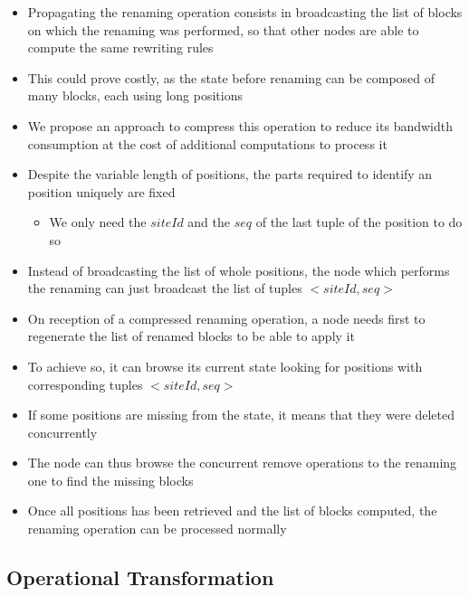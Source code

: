 \documentclass{article}
\theoremstyle{definition}
\begin{document}
\begin{itemize}
    \item Propagating the renaming operation consists in broadcasting the list of blocks on which the renaming was performed, so that other nodes are able to compute the same rewriting rules
    \item This could prove costly, as the state before renaming can be composed of many blocks, each using long positions
    \item We propose an approach to compress this operation to reduce its bandwidth consumption at the cost of additional computations to process it
    \item Despite the variable length of positions, the parts required to identify an position uniquely are fixed
    \begin{itemize}
        \item We only need the $siteId$ and the $seq$ of the last tuple of the position to do so
    \end{itemize}
    \item Instead of broadcasting the list of whole positions, the node which performs the renaming can just broadcast the list of tuples $<siteId, seq>$
    \item On reception of a compressed renaming operation, a node needs first to regenerate the list of renamed blocks to be able to apply it
    \item To achieve so, it can browse its current state looking for positions with corresponding tuples $<siteId, seq>$
    \item If some positions are missing from the state, it means that they were deleted concurrently
    \item The node can thus browse the concurrent remove operations to the renaming one to find the missing blocks
    \item Once all positions has been retrieved and the list of blocks computed, the renaming operation can be processed normally
\end{itemize}

\subsection{Operational Transformation}

\end{document}
